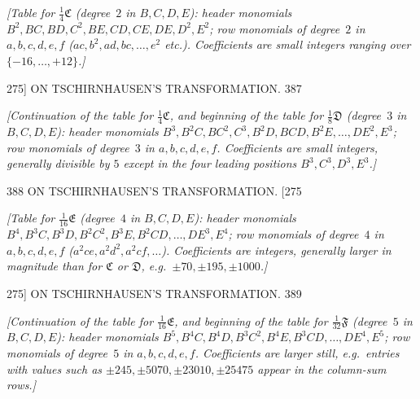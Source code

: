\documentclass[11pt]{article}
\begin{document}
\medskip
\noindent\textit{[Table for $\tfrac{1}{4}\mathfrak{C}$ (degree~$2$ in $B,C,D,E$):
header monomials $B^{2},BC,BD,C^{2},BE,CD,CE,DE,D^{2},E^{2}$; row monomials of degree~$2$
in $a,b,c,d,e,f$ ($ac,b^{2},ad,bc,\dots,e^{2}$ etc.). Coefficients are small integers ranging
over $\{-16,\dots,+12\}$.]}

\begin{center}
\textsc{275]} \hfill ON TSCHIRNHAUSEN'S TRANSFORMATION. \hfill 387
\end{center}

\noindent\textit{[Continuation of the table for $\tfrac{1}{4}\mathfrak{C}$, and beginning of the
table for $\tfrac{1}{8}\mathfrak{D}$ (degree~$3$ in $B,C,D,E$): header monomials
$B^{3},B^{2}C,BC^{2},C^{3},B^{2}D,BCD,B^{2}E,\dots,DE^{2},E^{3}$; row monomials of degree~$3$
in $a,b,c,d,e,f$. Coefficients are small integers, generally divisible by $5$ except in
the four leading positions $B^{3},C^{3},D^{3},E^{3}$.]}

\begin{center}
388 \hfill ON TSCHIRNHAUSEN'S TRANSFORMATION. \hfill \textsc{[275}
\end{center}

\noindent\textit{[Table for $\tfrac{1}{16}\mathfrak{E}$ (degree~$4$ in $B,C,D,E$):
header monomials $B^{4},B^{3}C,B^{3}D,B^{2}C^{2},B^{3}E,B^{2}CD,\dots,DE^{3},E^{4}$;
row monomials of degree~$4$ in $a,b,c,d,e,f$ ($a^{2}ce,a^{2}d^{2},a^{2}cf,\dots$).
Coefficients are integers, generally larger in magnitude than for $\mathfrak{C}$ or $\mathfrak{D}$,
e.g.\ $\pm 70,\pm 195,\pm 1000$.]}

\begin{center}
\textsc{275]} \hfill ON TSCHIRNHAUSEN'S TRANSFORMATION. \hfill 389
\end{center}

\noindent\textit{[Continuation of the table for $\tfrac{1}{16}\mathfrak{E}$, and beginning of
the table for $\tfrac{1}{32}\mathfrak{F}$ (degree~$5$ in $B,C,D,E$): header monomials
$B^{5},B^{4}C,B^{4}D,B^{3}C^{2},B^{4}E,B^{3}CD,\dots,DE^{4},E^{5}$; row monomials of degree~$5$
in $a,b,c,d,e,f$. Coefficients are larger still, e.g.\ entries with values such as
$\pm 245,\pm 5070,\pm 23010,\pm 25475$ appear in the column-sum rows.]}
\end{document}
